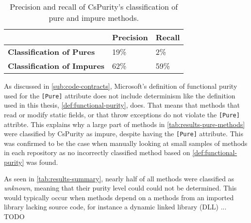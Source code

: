 \documentclass[a4paper,12pt]{article}
\begin{document}
\begin{table}[H]
  \centering
  \caption{Precision and recall of CsPurity's classification of pure and impure methods.}
  \label{tab:results-precision-recall}
  \begin{tabular}{|l|ll|}
    \hline
                                       & \textbf{Precision} & \textbf{Recall} \\
    \hline
    \textbf{Classification of Pures}   & 19\%               & 2\%             \\
    \textbf{Classification of Impures} & 62\%               & 59\%            \\
    \hline
  \end{tabular}
\end{table}

As discussed in \autoref{sub:code-contracts}, Microsoft's definition of functional purity used for the \texttt{[Pure]} attribute does not include determinism like the definition used in this thesis, \autoref{def:functional-purity}, does. That means that methods that read or modify static fields, or that throw exceptions do not violate the \texttt{[Pure]} attribte. This explains why a large part of methods in \autoref{tab:results-pure-methods} were classified by CsPurity as impure, despite having the \texttt{[Pure]} attribute. This was confirmed to be the case when manually looking at small samples of methods in each repository as no incorrectly classified method based on \autoref{def:functional-purity} was found.

As seen in \autoref{tab:results-summary}, nearly half of all methods were classified as \textit{unknown}, meaning that their purity level could could not be determined. This would typically occur when methods depend on a methods from an imported library lacking source code, for instance a dynamic linked library (DLL) ... TODO




\end{document}
